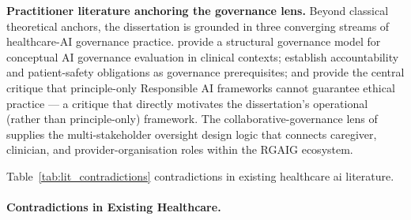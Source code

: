 \noindent\textbf{Practitioner literature anchoring the governance lens.} Beyond classical theoretical anchors, the dissertation is grounded in three converging streams of healthcare-AI governance practice. \cite{reddy2020governance} provide a structural governance model for conceptual AI governance evaluation in clinical contexts; \cite{habli2020aihealthcare} establish accountability and patient-safety obligations as governance prerequisites; and \cite{mittelstadt2019principles} provide the central critique that principle-only Responsible AI frameworks cannot guarantee ethical practice --- a critique that directly motivates the dissertation's operational (rather than principle-only) framework. The collaborative-governance lens of \cite{ansell2008collaborative} supplies the multi-stakeholder oversight design logic that connects caregiver, clinician, and provider-organisation roles within the RGAIG ecosystem.

\noindent Table~\ref{tab:lit_contradictions} contradictions in existing healthcare ai literature.

\paragraph{Contradictions in Existing Healthcare.}




